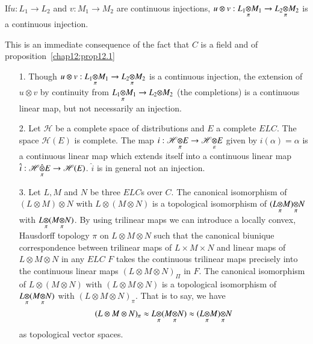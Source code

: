 \begin{coro*}
If\pageoriginale $u : L_1 \to L_2$ and $v:M_1 \to M_2$ are continuous
injections, $u\otimes v :L_1{\displaystyle\mathop{\otimes}_{\pi}}M_1
\to L_2{\displaystyle\mathop{\otimes}_{\pi}}M_2$ is a continuous injection. 

This is an immediate consequence of the fact that $C$ is a field and
of proposition~\ref{chap12:prop12.1} 
\end{coro*}

\begin{itemize}
\item [1.] Though $u \otimes v :\foprod{L_1}{M_1}{\pi} \to 
\foprod{L_2}{M_2}{\pi}$ is a continuous injection, the extension
of $u \otimes v$ by continuity from $\foprod{L_1}{M_1}{\pi}
\to \foprod{L_2}{M_2}{}$
  (the completions) is a continuous linear map, but not necessarily an
  injection.

\item [2.] Let $\mathscr{H}$ be a complete space of distributions and
  $E$ a complete $E L C$. The space $\mathscr{H}(E)$ is complete. The
  map $i :\foprod{\mathscr{H}}{E}{\pi} \to\foprod{\mathscr{H}}{E}
 {\varepsilon}$ given by $i(\alpha)=\alpha$
  is a continuous linear map which extends itself
  into a continuous linear map $\hat{i} :\fohprod{\mathscr{H}}{E}{\pi}
 \to\mathscr{H}(E)$. $\hat{i}$ is in general not an injection. 

\item [3.] Let $L, M$ and $N$ be three $E L C$s over $C$. The
  canonical isomorphism of $(L\otimes M)\otimes N$ with $L \otimes
  (M\otimes N)$ is a topological isomorphism of $(\foprod{L}{M}{\pi})
  \foprod{}{N}{\pi}$ with $\foprod{L}{}{\pi}(\foprod{M}{N}{\pi})$.
  By using trilinear maps we can introduce a locally convex, Hausdorff
  topology $\pi$ on $L\otimes M \otimes N$ such that the canonical
  biunique correspondence between trilinear maps of $L\times M\times
  N$ and linear maps of $L\otimes M\otimes N$ in any $E L C$ $F$ takes
  the continuous trilinear maps precisely into the continuous linear
  maps $(L\otimes M\otimes N)_\Pi$ in $F$. The canonical isomorphism of
  $L\otimes(M\otimes N)$ with $(L\otimes M\otimes N)$ is a topological
  isomorphism of $\foprod{L}{}{\pi}(\foprod{M}{N}{\pi})$
  with $(L\otimes M \otimes N)_\pi$. That is to say, we have
$$
(L\otimes M\otimes N)_\pi \approx \foprod{L}{}{\pi}(\foprod{M}{N}
{\pi})\approx (\foprod{L}{M}{\pi})\foprod{}{N}{\pi}
$$
as topological vector spaces. 
\end{itemize}



